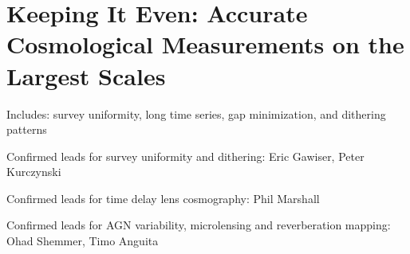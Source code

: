 \chapter[Cosmology]{Keeping It Even: Accurate Cosmological Measurements on the Largest
Scales}
\label{chp:cosmology}


Includes: survey uniformity, long time series, gap minimization, and
dithering patterns

Confirmed leads for survey uniformity and dithering: Eric Gawiser,
Peter Kurczynski

Confirmed leads for time delay lens cosmography: Phil Marshall

Confirmed leads for AGN variability, microlensing and reverberation
mapping: Ohad Shemmer, Timo Anguita
